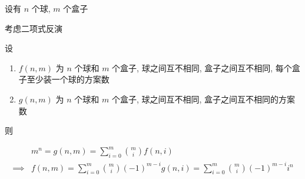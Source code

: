 设有 \(n\) 个球, \(m\) 个盒子

考虑二项式反演

设

\begin{enumerate}
    \item \(f(n,m)\) 为 \(n\) 个球和 \(m\) 个盒子, 球之间互不相同, 盒子之间互不相同, 每个盒子至少装一个球的方案数
    \item \(g(n,m)\) 为 \(n\) 个球和 \(m\) 个盒子, 球之间互不相同, 盒子之间互不相同的方案数
\end{enumerate}

则

\[
    \begin{aligned}
                 & m^n=g(n,m)=\sum_{i=0}^m\binom{m}{i}f(n,i)                                             \\
        \implies & f(n,m)=\sum_{i=0}^m\binom{m}{i}(-1)^{m-i}g(n,i)=\sum_{i=0}^m\binom{m}{i}(-1)^{m-i}i^n
    \end{aligned}
\]
